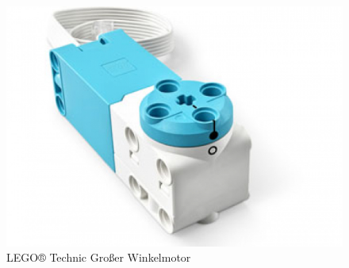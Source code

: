 \begin{figure}[H]
	\centering
	\includegraphics[width=0.4\linewidth]{images/Motor}
	\caption{LEGO® Technic Großer Winkelmotor}
	\label{fig:motor}
\end{figure}
